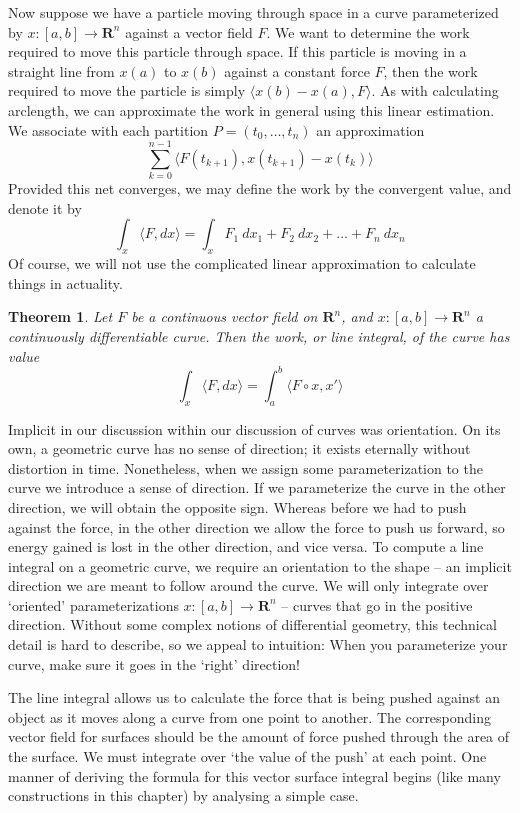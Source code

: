 \documentclass[12pt]{amsbook}
\theoremstyle{plain}
\newtheorem{theorem}{Theorem}
\theoremstyle{definition}
\begin{document}
Now suppose we have a particle moving through space in a curve parameterized by $x:[a,b] \to \mathbf{R}^n$ against a vector field $F$. We want to determine the work required to move this particle through space. If this particle is moving in a straight line from $x(a)$ to $x(b)$ against a constant force $F$, then the work required to move the particle is simply $\langle x(b) - x(a), F \rangle$. As with calculating arclength, we can approximate the work in general using this linear estimation. We associate with each partition $P = (t_0, \dots, t_n)$ an approximation
%
\[ \sum_{k = 0}^{n-1} \langle F(t_{k+1}), x(t_{k+1}) - x(t_k) \rangle \]
%
Provided this net converges, we may define the work by the convergent value, and denote it by
%
\[ \int_x \langle F, dx \rangle = \int_x F_1\ dx_1 + F_2\ dx_2 + \dots + F_n\ dx_n \]
%
Of course, we will not use the complicated linear approximation to calculate things in actuality.

\begin{theorem}
    Let $F$ be a continuous vector field on $\mathbf{R}^n$, and $x:[a,b] \to \mathbf{R}^n$ a continuously differentiable curve. Then the work, or line integral, of the curve has value
    \[ \int_x \langle F, dx \rangle = \int_a^b \langle F \circ x, x' \rangle \]
\end{theorem}

Implicit in our discussion within our discussion of curves was orientation. On its own, a geometric curve has no sense of direction; it exists eternally without distortion in time. Nonetheless, when we assign some parameterization to the curve we introduce a sense of direction. If we parameterize the curve in the other direction, we will obtain the opposite sign. Whereas before we had to push against the force, in the other direction we allow the force to push us forward, so energy gained is lost in the other direction, and vice versa. To compute a line integral on a geometric curve, we require an orientation to the shape -- an implicit direction we are meant to follow around the curve. We will only integrate over `oriented' parameterizations $x:[a,b] \to \mathbf{R}^n$ -- curves that go in the positive direction. Without some complex notions of differential geometry, this technical detail is hard to describe, so we appeal to intuition: When you parameterize your curve, make sure it goes in the `right' direction!

The line integral allows us to calculate the force that is being pushed against an object as it moves along a curve from one point to another. The corresponding vector field for surfaces should be the amount of force pushed through the area of the surface. We must integrate over `the value of the push' at each point. One manner of deriving the formula for this vector surface integral begins (like many constructions in this chapter) by analysing a simple case.
\end{document}
